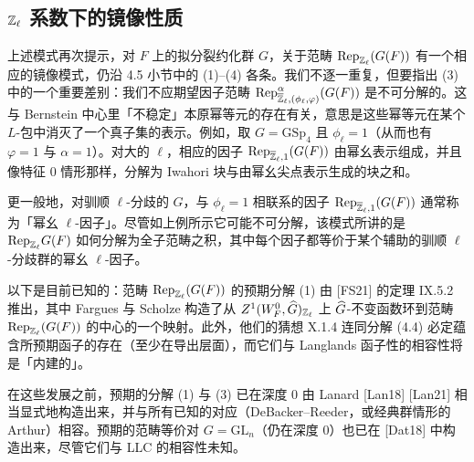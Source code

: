 \subsection{$\mathbb{Z}_\ell$ 系数下的镜像性质}

上述模式再次提示，对 $F$ 上的拟分裂约化群 $G$，关于范畴 $\mathrm{Rep}_{\mathbb{Z}_\ell}(G(F))$ 有一个相应的镜像模式，仍沿 4.5 小节中的 (1)–(4) 各条。我们不逐一重复，但要指出 (3) 中的一个重要差别：我们不应期望因子范畴 $\mathrm{Rep}^{\alpha}_{\overline{\mathbb{Z}}_\ell,(\phi_\ell,\varphi)}(G(F))$ 是不可分解的。这与 Bernstein 中心里「不稳定」本原幂等元的存在有关，意思是这些幂等元在某个 $L$-包中消灭了一个真子集的表示。例如，取 $G=\mathrm{GSp}_4$ 且 $\phi_\ell=1$（从而也有 $\varphi=1$ 与 $\alpha=1$）。对大的 $\ell$，相应的因子 $\mathrm{Rep}_{\overline{\mathbb{Z}}_\ell,1}(G(F))$ 由幂幺表示组成，并且像特征 $0$ 情形那样，分解为 Iwahori 块与由幂幺尖点表示生成的块之和。

更一般地，对驯顺 $\ell$-分歧的 $G$，与 $\phi_\ell=1$ 相联系的因子 $\mathrm{Rep}_{\overline{\mathbb{Z}}_\ell,1}(G(F))$ 通常称为「幂幺 $\ell$-因子」。尽管如上例所示它可能不可分解，该模式所讲的是 $\mathrm{Rep}_{\mathbb{Z}_\ell}G(F)$ 如何分解为全子范畴之积，其中每个因子都等价于某个辅助的驯顺 $\ell$-分歧群的幂幺 $\ell$-因子。

以下是目前已知的：范畴 $\mathrm{Rep}_{\mathbb{Z}_\ell}(G(F))$ 的预期分解 (1) 由 [FS21] 的定理 IX.5.2 推出，其中 Fargues 与 Scholze 构造了从 $Z^1(W^0_F,\widehat{G})_{\mathbb{Z}_\ell}$ 上 $\widehat{G}$-不变函数环到范畴 $\mathrm{Rep}_{\mathbb{Z}_\ell}(G(F))$ 的中心的一个映射。此外，他们的猜想 X.1.4 连同分解 (4.4) 必定蕴含所预期函子的存在（至少在导出层面），而它们与 Langlands 函子性的相容性将是「内建的」。

在这些发展之前，预期的分解 (1) 与 (3) 已在深度 $0$ 由 Lanard [Lan18] [Lan21] 相当显式地构造出来，并与所有已知的对应（DeBacker–Reeder，或经典群情形的 Arthur）相容。预期的范畴等价对 $G=\mathrm{GL}_n$（仍在深度 $0$）也已在 [Dat18] 中构造出来，尽管它们与 LLC 的相容性未知。
